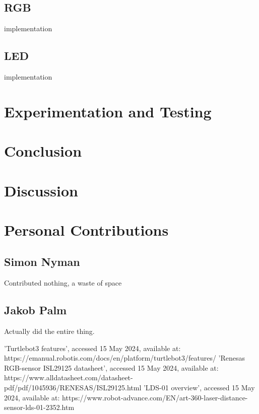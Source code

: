 \documentclass[conference]{IEEEtran}
\begin{document}
\subsection{RGB}
implementation
\subsection{LED}
implementation
\section{Experimentation and Testing}

\section{Conclusion}

\section{Discussion}

\section{Personal Contributions}

\subsection{Simon Nyman}
Contributed nothing, a waste of space

\subsection{Jakob Palm}
Actually did the entire thing.

\begin{thebibliography}{00}
 'Turtlebot3 features', accessed 15 May 2024, available at: https://emanual.robotis.com/docs/en/platform/turtlebot3/features/
 'Renesas RGB-sensor ISL29125 datasheet', accessed 15 May 2024, available at: https://www.alldatasheet.com/datasheet-pdf/pdf/1045936/RENESAS/ISL29125.html
 'LDS-01 overview', accessed 15 May 2024, available at: https://www.robot-advance.com/EN/art-360-laser-distance-sensor-lds-01-2352.htm
\end{thebibliography}
\end{document}
